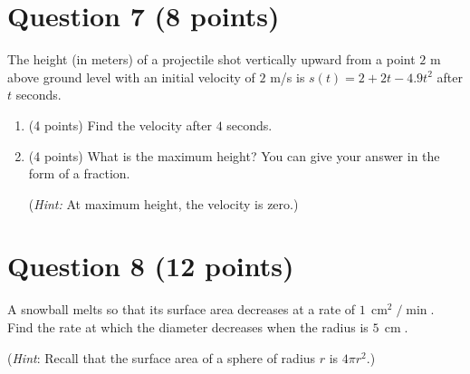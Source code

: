 \documentclass{article}
\begin{document}
\pagebreak





\section*{Question 7 (8 points)}
The height (in meters) of a projectile shot vertically upward from a point $2$ m above ground level with an initial velocity of $2$ m/s is $s(t)=2+2t-4.9t^2$ after $t$ seconds.

    \begin{enumerate}[label=(\alph*)]
        \item (4 points) Find the velocity after $4$ seconds.
        \vspace{3in}
        \item (4 points) What is the maximum height? You can give your answer in the form of a fraction.

        (\textit{Hint:} At maximum height, the velocity is zero.)
    \end{enumerate}

\pagebreak

\section*{Question 8 (12 points)}
A snowball melts so that its surface area decreases at a rate of $1 \, \operatorname{cm}^2/\operatorname{min}$. Find the rate at which the diameter decreases when the radius is $5 \, \operatorname{cm}$.

(\textit{Hint}: Recall that the surface area of a sphere of radius $r$ is $4 \pi r^2$.)
\end{document}
